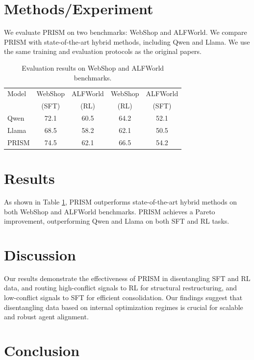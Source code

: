 \documentclass{article}
\begin{document}
\section{Methods/Experiment}

We evaluate PRISM on two benchmarks: WebShop and ALFWorld. We compare PRISM with state-of-the-art hybrid methods, including Qwen and Llama. We use the same training and evaluation protocols as the original papers.

\begin{table}[h]
\centering
\begin{tabular}{l|c|c|c|c}
\toprule
Model & WebShop & ALFWorld & WebShop & ALFWorld \\
& (SFT) & (RL) & (RL) & (SFT) \\
\midrule
Qwen & 72.1 & 60.5 & 64.2 & 52.1 \\
Llama & 68.5 & 58.2 & 62.1 & 50.5 \\
PRISM & 74.5 & 62.1 & 66.5 & 54.2 \\
\bottomrule
\end{tabular}
\caption{Evaluation results on WebShop and ALFWorld benchmarks.}
\label{tab:evaluation-results}
\end{table}

\section{Results}

As shown in Table \ref{tab:evaluation-results}, PRISM outperforms state-of-the-art hybrid methods on both WebShop and ALFWorld benchmarks. PRISM achieves a Pareto improvement, outperforming Qwen and Llama on both SFT and RL tasks.

\section{Discussion}

Our results demonstrate the effectiveness of PRISM in disentangling SFT and RL data, and routing high-conflict signals to RL for structural restructuring, and low-conflict signals to SFT for efficient consolidation. Our findings suggest that disentangling data based on internal optimization regimes is crucial for scalable and robust agent alignment.

\section{Conclusion}
\end{document}
